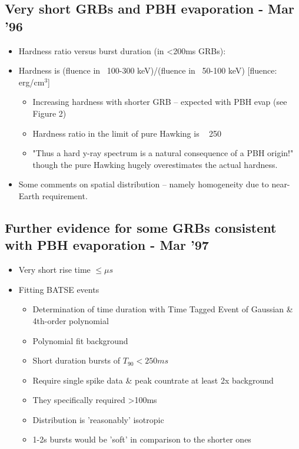 \documentclass[12pt]{article}
\begin{document}
\subsection{Very short GRBs and PBH evaporation - Mar '96}
\begin{itemize}
    \item Hardness ratio versus burst duration (in <200ms GRBs):
    \item Hardness is (fluence in ~100-300 keV)/(fluence in ~50-100 keV) [fluence: erg/cm$^3$]
    \begin{itemize}
        \item Increasing hardness with shorter GRB -- expected with PBH evap (see Figure 2)
        \item Hardness ratio in the limit of pure Hawking is ~ 250
        \item "Thus a hard y-ray spectrum is a natural consequence of a PBH origin!" though the pure Hawking hugely overestimates the actual hardness.
    \end{itemize}
    \item Some comments on spatial distribution -- namely homogeneity due to near-Earth requirement.
\end{itemize}

\subsection{Further evidence for some GRBs consistent with PBH evaporation - Mar '97}
\begin{itemize}
    \item Very short rise time $\leq \mu s$
    \item Fitting BATSE events
    \begin{itemize}
        \item Determination of time duration with Time Tagged Event of Gaussian & 4th-order polynomial
        \item Polynomial fit background
        \item Short duration bursts of $T_{90}<250ms$
        \item Require single spike data & peak countrate at least 2x background
        \item They specifically required >100ms
        \item Distribution is 'reasonably' isotropic
        \item 1-2s bursts would be 'soft' in comparison to the shorter ones
    \end{itemize}
\end{itemize}
\end{document}
